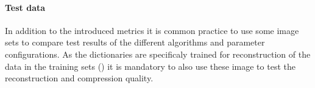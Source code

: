 \paragraph{Test data}
In addition to the introduced metrics it is common practice to use some image
sets to compare test results of the different algorithms and parameter
configurations. As the dictionaries are specificaly trained for
reconstruction of the data in the training sets
() it is mandatory to also use
these image to test the reconstruction and
compression quality. 
\begin{figure}[h]
\centering
\hspace{5mm}
\hspace{5mm}
\hspace{5mm}

\end{figure}
